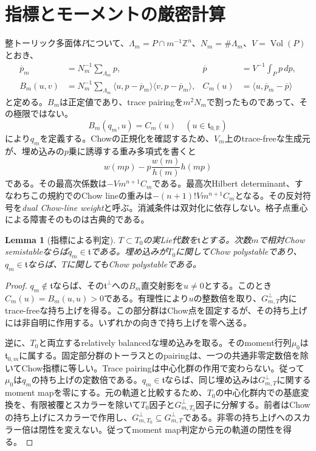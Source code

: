 \documentclass[12pt]{amsart}
\newtheorem{lem}[thm]{Lemma}
\theoremstyle{definition}
\theoremstyle{remark}
\numberwithin{equation}{section}
\DeclareMathOperator{\Vol}{Vol}
\newcommand{\R}{\mathbb{R}}
\newcommand{\Z}{\mathbb{Z}}
\begin{document}
\section{指標とモーメントの厳密計算}
整トーリック多面体$P$について、$\Lambda_m=P\cap m^{-1}\Z^n$、$N_m=\#\Lambda_m$、$V=\Vol(P)$とおき、
\begin{align}\label{ja-means}
\overline p_m&=N_m^{-1}\sum_{\Lambda_m}p,&
\overline p&=V^{-1}\int_Pp\,dp,\\
B_m(u,v)&=N_m^{-1}\sum_{\Lambda_m}
\langle u,p-\overline p_m\rangle\langle v,p-\overline p_m\rangle,&
C_m(u)&=\langle u,\overline p_m-\overline p\rangle\label{ja-char}
\end{align}
と定める。$B_m$は正定値であり、trace pairingを$m^2N_m$で割ったものであって、その極限ではない。
\begin{equation}\label{ja-dual}
B_m(q_m,u)=C_m(u)\quad(u\in\mathfrak t_{0,\R})
\end{equation}
により$q_m$を定義する。Chowの正規化を確認するため、$V_m$上のtrace-freeな生成元が、埋め込みの$p$乗に誘導する重み多項式を書くと
\[
w(mp)-p\frac{w(m)}{h(m)}h(mp)
\]
である。その最高次係数は$-Vm^{n+1}C_m$である。最高次Hilbert determinant、すなわちこの規約でのChow lineの重みは$-(n+1)!Vm^{n+1}C_m$となる。その反対符号を\emph{dual Chow-line weight}と呼ぶ。消滅条件は双対化に依存しない。格子点重心による障害そのものは古典的である\cite{ja-YZ,ja-LY26}。

\begin{lem}[指標による判定]\label{ja-test}
$T\subset T_0$の実Lie代数を$\mathfrak t$とする。次数$m$で相対Chow semistableならば$q_m\in\mathfrak t$である。埋め込みが$T_0$に関してChow polystableであり、$q_m\in\mathfrak t$ならば、$T$に関してもChow polystableである。
\end{lem}
\begin{proof}
$q_m\notin\mathfrak t$ならば、その$\mathfrak t^\perp$への$B_m$直交射影を$u\ne0$とする。このとき$C_m(u)=B_m(u,u)>0$である。有理性により$u$の整数倍を取り、$G_{m,T}^{\perp}$内にtrace-freeな持ち上げを得る。この部分群はChow点を固定するが、その持ち上げには非自明に作用する。いずれかの向きで持ち上げを零へ送る。

逆に、$T_0$と両立するrelatively balancedな埋め込みを取る。そのmoment行列$\mu_0$は$\mathfrak t_{0,m}$に属する。固定部分群のトーラスとのpairingは、一つの共通非零定数倍を除いてChow指標に等しい。Trace pairingは中心化群の作用で変わらない。従って$\mu_0$は$q_m$の持ち上げの定数倍である。$q_m\in\mathfrak t$ならば、同じ埋め込みは$G_{m,T}^{\perp}$に関するmoment mapを零にする。元の軌道と比較するため、$T_0$の中心化群内での基底変換を、有限被覆とスカラーを除いて$T_0$因子と$G_{m,T_0}^{\perp}$因子に分解する。前者はChowの持ち上げにスカラーで作用し、$G_{m,T_0}^{\perp}\subseteq G_{m,T}^{\perp}$である。非零の持ち上げへのスカラー倍は閉性を変えない。従ってmoment map判定から元の軌道の閉性を得る。
\end{proof}
\end{document}
